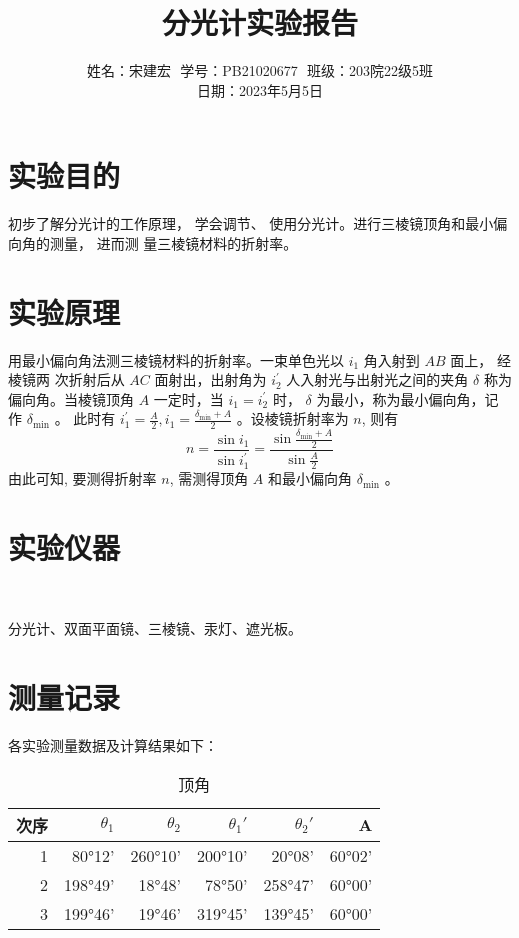 \documentclass{article}
\title{分光计实验报告}
\author{姓名：宋建宏\,\, 学号：PB21020677\,\, 班级：203院22级5班\\ 日期：2023年5月5日}
\date{}
\begin{document}
\maketitle

\section*{实验目的}
初步了解分光计的工作原理， 学会调节、 使用分光计。进行三棱镜顶角和最小偏向角的测量， 进而测
量三棱镜材料的折射率。

\section*{实验原理}
用最小偏向角法测三棱镜材料的折射率。一束单色光以 $i_1$ 角入射到 $A B$ 面上， 经棱镜两 次折射后从 $A C$ 面射出，出射角为 $i_2^{\prime}$ 人入射光与出射光之间的夹角 $\delta$ 称为偏向角。当棱镜顶角 $A$ 一定时，当 $i_1=i_2^{\prime}$ 时， $\delta$ 为最小，称为最小偏向角，记作 $\delta_{\min }$ 。
此时有 $i_1^{\prime}=\frac{A}{2}, i_1=\frac{\delta_{\min }+A}{2}$ 。设棱镜折射率为 $n$, 则有
$$
n=\frac{\sin i_1}{\sin i_1^{\prime}}=\frac{\sin \frac{\delta_{\min }+A}{2}}{\sin \frac{A}{2}}
$$
由此可知, 要测得折射率 $n$, 需测得顶角 $A$ 和最小偏向角 $\delta_{\min }$ 。


\section*{实验仪器}
\

分光计、双面平面镜、三棱镜、汞灯、遮光板。
\section*{测量记录}
各实验测量数据及计算结果如下：

\begin{table}[htbp]
    \centering
    \caption{顶角}
      \begin{tabular}{|r|r|r|r|r|r|}
      \hline
      \multicolumn{1}{|l|}{次序} & $\theta_1$     & $\theta_2$     & \multicolumn{1}{r|}{$\theta_1'$} & \multicolumn{1}{r|}{$\theta_2'$} & \multicolumn{1}{r|}{A} \bigstrut\\
      \hline
      1     & 80°12' & 260°10' & 200°10' & 20°08' & 60°02' \bigstrut\\
      \hline
      2     & 198°49' & 18°48' & 78°50' & 258°47' & 60°00' \bigstrut\\
      \hline
      3     & 199°46' & 19°46' & 319°45' & 139°45' & 60°00' \bigstrut\\
      \hline
      \end{tabular}%

  \end{table}%
  
\end{document}
